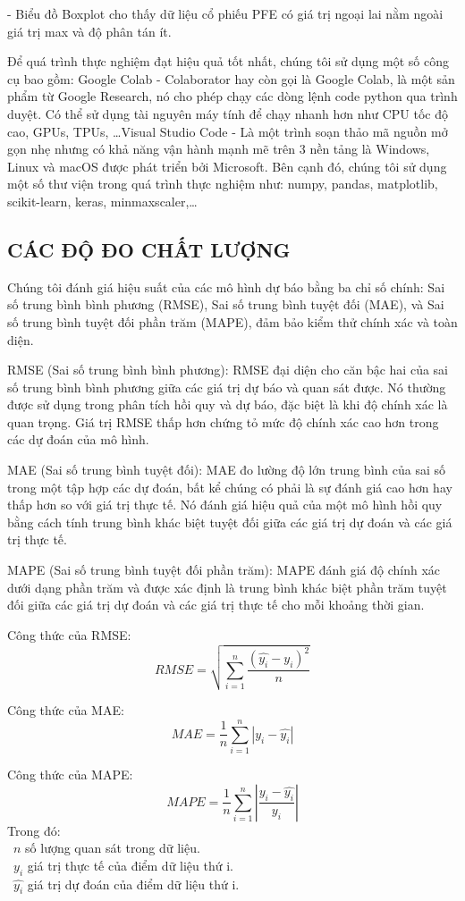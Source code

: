 \documentclass[conference]{IEEEtran}
\begin{document}
- Biểu đồ Boxplot cho thấy dữ liệu cổ phiếu PFE có giá trị ngoại lai nằm ngoài giá trị max và độ phân tán ít.

Để quá trình thực nghiệm đạt hiệu quả tốt nhất, chúng tôi sử dụng một số công cụ bao gồm: Google Colab - Colaborator hay còn gọi là Google Colab, là một sản phẩm từ Google Research, nó cho phép chạy các dòng lệnh code python qua trình duyệt. Có thể sử dụng tài nguyên máy tính để chạy nhanh hơn như CPU tốc độ cao, GPUs, TPUs, …Visual Studio Code - Là một trình soạn thảo mã nguồn mở gọn nhẹ nhưng có khả năng vận hành mạnh mẽ trên 3 nền tảng là Windows, Linux và macOS được phát triển bởi Microsoft. Bên cạnh đó, chúng tôi sử dụng một số thư viện trong quá trình thực nghiệm như: numpy, pandas, matplotlib, scikit-learn, keras, minmaxscaler,…
\subsection{CÁC ĐỘ ĐO CHẤT LƯỢNG}
Chúng tôi đánh giá hiệu suất của các mô hình dự báo bằng ba chỉ số chính: Sai số trung bình bình phương (RMSE), Sai số trung bình tuyệt đối (MAE), và Sai số trung bình tuyệt đối phần trăm (MAPE), đảm bảo kiểm thử chính xác và toàn diện.

RMSE (Sai số trung bình bình phương): RMSE đại diện cho căn bậc hai của sai số trung bình bình phương giữa các giá trị dự báo và quan sát được. Nó thường được sử dụng trong phân tích hồi quy và dự báo, đặc biệt là khi độ chính xác là quan trọng. Giá trị RMSE thấp hơn chứng tỏ mức độ chính xác cao hơn trong các dự đoán của mô hình.

MAE (Sai số trung bình tuyệt đối): MAE đo lường độ lớn trung bình của sai số trong một tập hợp các dự đoán, bất kể chúng có phải là sự đánh giá cao hơn hay thấp hơn so với giá trị thực tế. Nó đánh giá hiệu quả của một mô hình hồi quy bằng cách tính trung bình khác biệt tuyệt đối giữa các giá trị dự đoán và các giá trị thực tế.

MAPE (Sai số trung bình tuyệt đối phần trăm): MAPE đánh giá độ chính xác dưới dạng phần trăm và được xác định là trung bình khác biệt phần trăm tuyệt đối giữa các giá trị dự đoán và các giá trị thực tế cho mỗi khoảng thời gian.

Công thức của RMSE:
\[RMSE=\sqrt{\sum_{i=1}^{n} \frac{(\hat{y_i}-y_i )^2}{n} }\]

Công thức của MAE:
\[MAE=\frac{1}{n}  \sum_{i=1}^{n} |y_i-\hat{y_i} |\]

Công thức của MAPE:
\[MAPE=\frac{1}{n}  \sum_{i=1}^{n} |\frac{y_i-\hat{y_i}}{y_i}|\]
Trong đó:\\
	\indent\textbullet\ \(n\) số lượng quan sát trong dữ liệu.\\
	\indent\textbullet\ \(y_i\)  giá trị thực tế của điểm dữ liệu thứ i.\\
	\indent\textbullet\ \(\hat{y_i}\) giá trị dự đoán của điểm dữ liệu thứ i.
\end{document}

